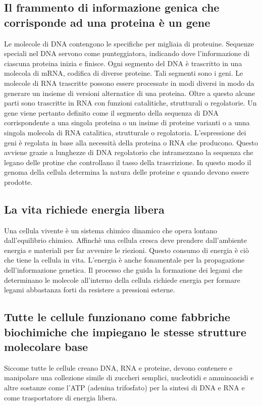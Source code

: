 \subsection{Il frammento di informazione genica che corrisponde ad una proteina \`e un gene}
Le molecole di DNA contengono le specifiche per migliaia di proteuine. Sequenze speciali nel DNA servono come punteggiatora, indicando dove l'informazione di ciascuna proteina inizia e
finisce. Ogni segmento del DNA \`e trascritto in una molecola di mRNA, codifica di diverse proteine. Tali segmenti sono i geni. Le molecole di RNA trascritte possono essere processate
in modi diversi in modo da generare un insieme di versioni alternatice di una proteina. Oltre a questo alcune parti sono trascritte in RNA con funzioni catalitiche, strutturali o 
regolatorie. Un gene viene pertanto definito come il segmento della sequenza di DNA corrispondente a una singola proteina o un insime di proteine varianti o a unna singola molecola di 
RNA catalitica, strutturale o regolatoria. L'espressione dei geni \`e regolata in base alla necessit\`a della proteina o RNA che producono. Questo avviene grazie a lunghezze di DNA
regolatorio che intramezzano la sequenza che legano delle protine che controllano il tasso della trascrizione. In questo modo il genoma della cellula determina la natura delle proteine e
quando devono essere prodotte.
\subsection{La vita richiede energia libera}
Una cellula vivente \`e un sistema chimico dinamico che opera lontano dall'equilibrio chimico. Affinch\`e una cellula cresca deve prendere dall'ambiente energia e materiali per far
avvenire le riezioni. Questo consumo di energia \`e ci\`o che tiene la cellula in vita. L'energia \`e anche fonamentale per la propagazione dell'informazione genetica. Il processo che
guida la formazione dei legami che determinano le molecole all'interno della cellula richiede energia per formare legami abbastanza forti da resistere a pressioni esterne. 
\subsection{Tutte le cellule funzionano come fabbriche biochimiche che impiegano le stesse strutture molecolare base}
Siccome tutte le cellule creano DNA, RNA e proteine, devono contenere e manipolare una collezione simile di zuccheri semplici, nucleotidi e amminoacidi e altre sostanze come l'ATP 
(adenina trifosfato) per la sintesi di DNA e RNA e come trasportatore di energia libera. 
